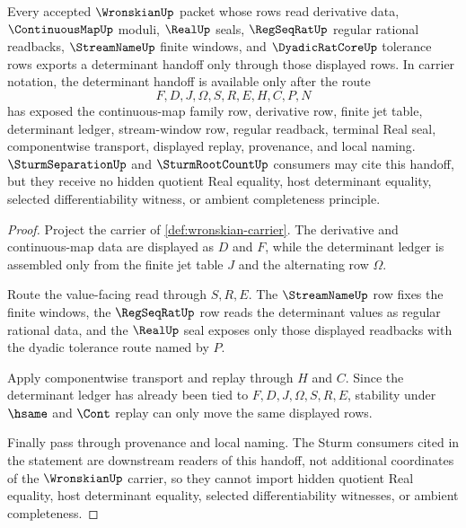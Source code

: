 \begin{theorem}
\label{thm:wronskian-regular-cauchy-determinant-handoff}
Every accepted $\WronskianUp$ packet whose rows read derivative data, $\ContinuousMapUp$ moduli, $\RealUp$ seals, $\RegSeqRatUp$ regular rational readbacks, $\StreamNameUp$ finite windows, and $\DyadicRatCoreUp$ tolerance rows exports a determinant handoff only through those displayed rows. In carrier notation, the determinant handoff is available only after the route
$$
F,D,J,\Omega,S,R,E,H,C,P,N
$$
has exposed the continuous-map family row, derivative row, finite jet table, determinant ledger, stream-window row, regular readback, terminal Real seal, componentwise transport, displayed replay, provenance, and local naming. $\SturmSeparationUp$ and $\SturmRootCountUp$ consumers may cite this handoff, but they receive no hidden quotient Real equality, host determinant equality, selected differentiability witness, or ambient completeness principle.
\end{theorem}
\begin{proof}
Project the carrier of \autoref{def:wronskian-carrier}. The derivative and continuous-map data are displayed as $D$ and $F$, while the determinant ledger is assembled only from the finite jet table $J$ and the alternating row $\Omega$.

Route the value-facing read through $S,R,E$. The $\StreamNameUp$ row fixes the finite windows, the $\RegSeqRatUp$ row reads the determinant values as regular rational data, and the $\RealUp$ seal exposes only those displayed readbacks with the dyadic tolerance route named by $P$.

Apply componentwise transport and replay through $H$ and $C$. Since the determinant ledger has already been tied to $F,D,J,\Omega,S,R,E$, stability under $\hsame$ and $\Cont$ replay can only move the same displayed rows.

Finally pass through provenance and local naming. The Sturm consumers cited in the statement are downstream readers of this handoff, not additional coordinates of the $\WronskianUp$ carrier, so they cannot import hidden quotient Real equality, host determinant equality, selected differentiability witnesses, or ambient completeness.
\end{proof}

